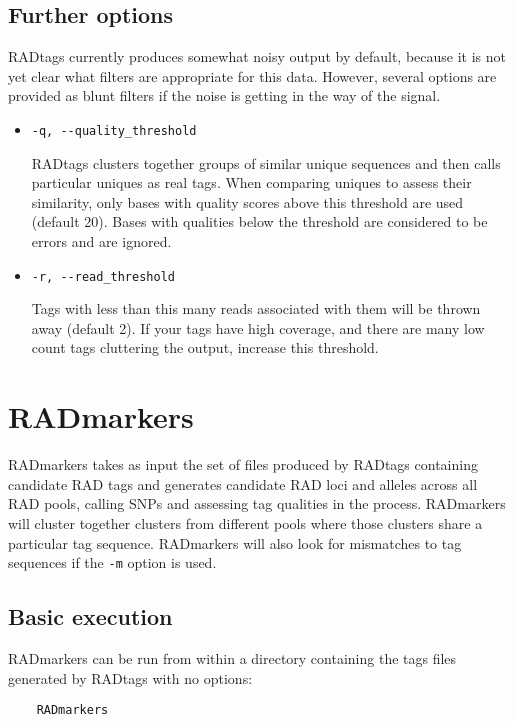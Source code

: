 \documentclass[a4paper]{article}
\begin{document}
\subsection{Further options}

RADtags currently produces somewhat noisy output by default, because it is not yet clear what filters are appropriate for this data. However, several options are provided as blunt filters if the noise is getting in the way of the signal.

\begin{itemize}
    \item \verb|-q, --quality_threshold|
    
    RADtags clusters together groups of similar unique sequences and then calls particular uniques as real tags. When comparing uniques to assess their similarity, only bases with quality scores above this threshold are used (default 20). Bases with qualities below the threshold are considered to be errors and are ignored.
    
    \item \verb|-r, --read_threshold|
    
    Tags with less than this many reads associated with them will be thrown away (default 2). If your tags have high coverage, and there are many low count tags cluttering the output, increase this threshold.
    
\end{itemize}


\section{RADmarkers}

RADmarkers takes as input the set of files produced by RADtags containing candidate RAD tags and generates candidate RAD loci and alleles across all RAD pools, calling SNPs and assessing tag qualities in the process. RADmarkers will cluster together clusters from different pools where those clusters share a particular tag sequence. RADmarkers will also look for mismatches to tag sequences if the \verb|-m| option is used.

\subsection{Basic execution}
RADmarkers can be run from within a directory containing the tags files generated by RADtags with no options:

\begin{verbatim}
    RADmarkers
\end{verbatim}
\end{document}
